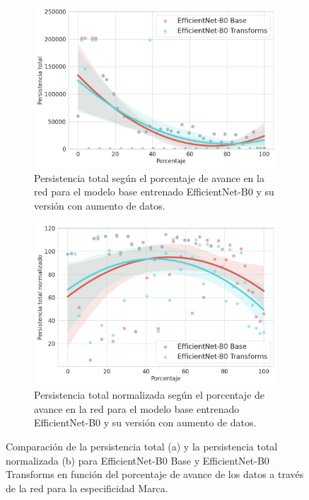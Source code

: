 \begin{figure}[H]
	\centering
	\begin{subfigure}
		{.5\textwidth}
		\centering
		\includegraphics[width=\linewidth]{img/m.png}
		\caption{Persistencia total según el porcentaje de avance en la red para el
			modelo base entrenado EfficientNet-B0 y su versión con aumento de datos.}
		\label{fig:m-homology-1}
	\end{subfigure}%
	\begin{subfigure}
		{.5\textwidth}
		\centering
		\includegraphics[width=\linewidth]{img/m_norm.png}
		\caption{Persistencia total normalizada según el porcentaje de avance en la
			red para el modelo base entrenado EfficientNet-B0 y su versión con aumento
			de datos.}
		\label{fig:m-homology-2}
	\end{subfigure}
	\caption{Comparación de la persistencia total (a) y la persistencia total
		normalizada (b) para EfficientNet-B0 Base y EfficientNet-B0 Transforms en
		función del porcentaje de avance de los datos a través de la red para la
		especificidad Marca.}
	\label{fig:m-homology}
\end{figure}

